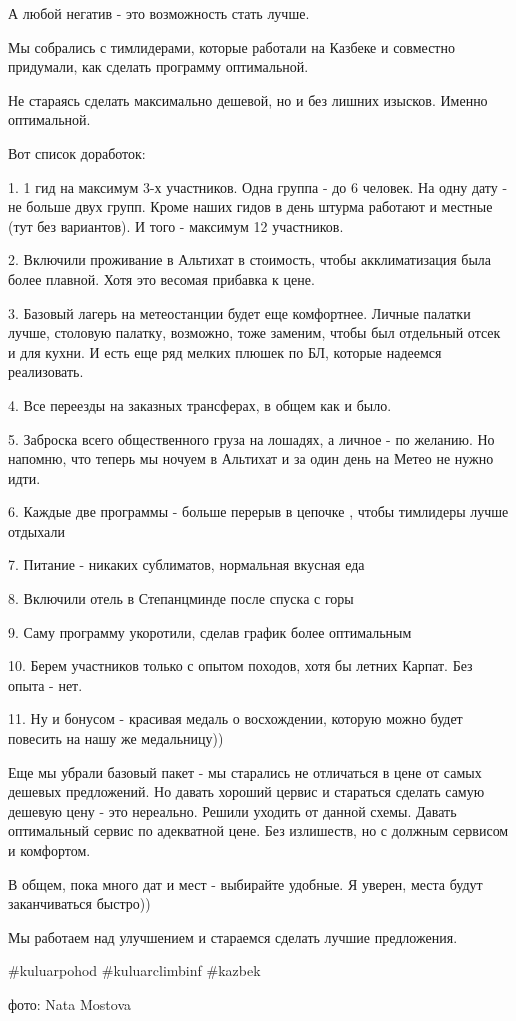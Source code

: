 А любой негатив - это возможность стать лучше. 

Мы собрались с тимлидерами, которые работали на Казбеке и совместно придумали,
как сделать программу оптимальной. 

Не стараясь сделать максимально дешевой, но и без лишних изысков. Именно
оптимальной. 

Вот список доработок: 

1. 1 гид на максимум 3-х участников. Одна группа - до 6 человек. На одну дату -
не больше двух групп. Кроме наших гидов в день штурма работают и местные (тут
без вариантов). И того - максимум 12 участников. 

2. Включили проживание в Альтихат в стоимость, чтобы акклиматизация была более
плавной. Хотя это весомая прибавка к цене. 

3. Базовый лагерь на метеостанции будет еще комфортнее. Личные палатки лучше,
столовую палатку, возможно, тоже заменим, чтобы был отдельный отсек и для
кухни. И есть еще ряд мелких плюшек по БЛ, которые надеемся реализовать. 

4. Все переезды на заказных трансферах, в общем как и было. 

5. Заброска всего общественного груза на лошадях, а личное - по желанию. Но
напомню, что теперь мы ночуем в Альтихат и за один день на Метео не нужно идти. 

6. Каждые две программы - больше перерыв в цепочке , чтобы тимлидеры лучше
отдыхали

7. Питание - никаких сублиматов, нормальная вкусная еда

8. Включили отель в Степанцминде после спуска с горы

9. Саму программу укоротили, сделав график более оптимальным

10. Берем участников только с опытом походов, хотя бы летних Карпат. Без опыта
- нет.

11. Ну и бонусом - красивая медаль о восхождении, которую можно будет повесить
на нашу же медальницу)) 

Еще мы убрали базовый пакет - мы старались не отличаться в цене от самых
дешевых предложений. Но давать хороший цервис и стараться сделать самую дешевую
цену - это нереально. Решили уходить от данной схемы. Давать оптимальный сервис
по адекватной цене. Без излишеств, но с должным сервисом и комфортом. 

В общем, пока много дат и мест - выбирайте удобные. Я уверен, места будут
заканчиваться быстро)) 

Мы работаем над улучшением и стараемся сделать лучшие предложения. 

\#kuluarpohod \#kuluarclimbinf \#kazbek

фото: Nata Mostova

